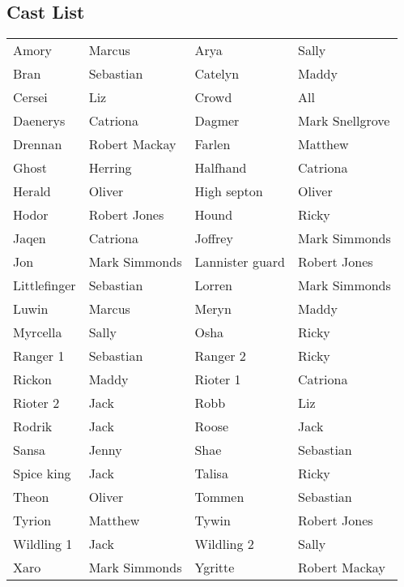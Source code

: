 \subsection*{Cast List}
\begin{tabular}{ll|ll}\\
Amory & Marcus &  Arya & Sally\\
Bran & Sebastian &  Catelyn & Maddy\\
Cersei & Liz &  Crowd & All\\
Daenerys & Catriona &  Dagmer & Mark Snellgrove\\
Drennan & Robert Mackay &  Farlen & Matthew\\
Ghost & Herring &  Halfhand & Catriona\\
Herald & Oliver &  High septon & Oliver\\
Hodor & Robert Jones &  Hound & Ricky\\
Jaqen & Catriona &  Joffrey & Mark Simmonds\\
Jon & Mark Simmonds &  Lannister guard & Robert Jones\\
Littlefinger & Sebastian &  Lorren & Mark Simmonds\\
Luwin & Marcus &  Meryn & Maddy\\
Myrcella & Sally &  Osha & Ricky\\
Ranger 1 & Sebastian &  Ranger 2 & Ricky\\
Rickon & Maddy &  Rioter 1 & Catriona\\
Rioter 2 & Jack &  Robb & Liz\\
Rodrik & Jack &  Roose & Jack\\
Sansa & Jenny &  Shae & Sebastian\\
Spice king & Jack &  Talisa & Ricky\\
Theon & Oliver &  Tommen & Sebastian\\
Tyrion & Matthew &  Tywin & Robert Jones\\
Wildling 1 & Jack &  Wildling 2 & Sally\\
Xaro & Mark Simmonds &  Ygritte & Robert Mackay\\
\end{tabular}
